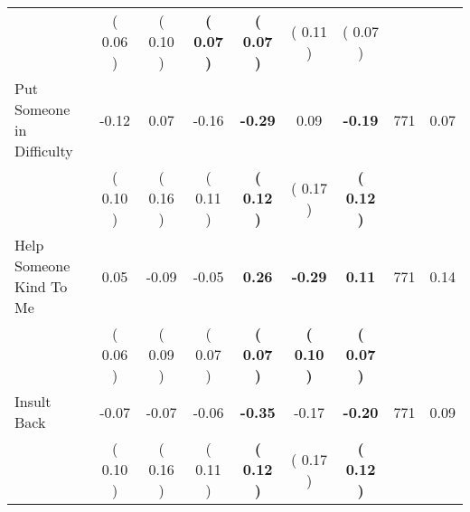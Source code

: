 \begin{tabular}{lcccccccc}
 & (     0.06 ) & (     0.10 ) & \textbf{(     0.07 )} & \textbf{(     0.07 )} & (     0.11 ) & (     0.07 ) & \\
Put Someone in Difficulty &     -0.12 &      0.07 &     -0.16 & \textbf{    -0.29} &      0.09 & \textbf{    -0.19} & 771 &       0.07 \\ 
 & (     0.10 ) & (     0.16 ) & (     0.11 ) & \textbf{(     0.12 )} & (     0.17 ) & \textbf{(     0.12 )} & \\
Help Someone Kind To Me &      0.05 &     -0.09 &     -0.05 & \textbf{     0.26} & \textbf{    -0.29} & \textbf{     0.11} & 771 &       0.14 \\ 
 & (     0.06 ) & (     0.09 ) & (     0.07 ) & \textbf{(     0.07 )} & \textbf{(     0.10 )} & \textbf{(     0.07 )} & \\
Insult Back &     -0.07 &     -0.07 &     -0.06 & \textbf{    -0.35} &     -0.17 & \textbf{    -0.20} & 771 &       0.09 \\ 
 & (     0.10 ) & (     0.16 ) & (     0.11 ) & \textbf{(     0.12 )} & (     0.17 ) & \textbf{(     0.12 )} & \\
\bottomrule
\end{tabular}
